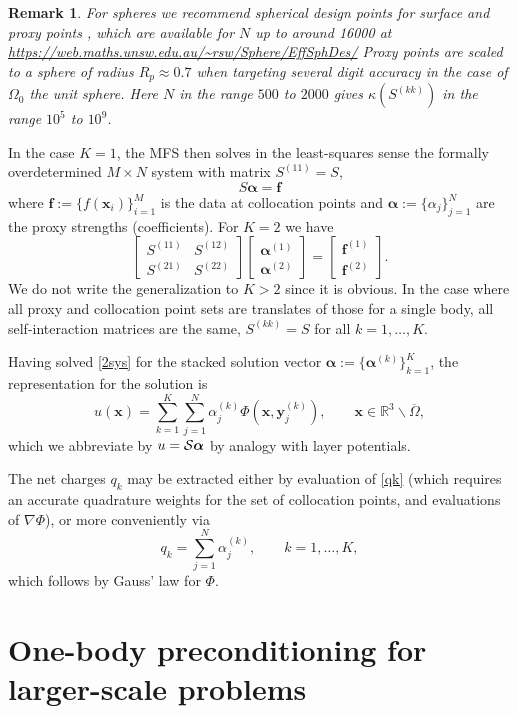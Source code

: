 \documentclass[10pt]{article}
\newcommand{\be}{\begin{equation}}
\newcommand{\ee}{\end{equation}}
\newcommand{\R}{\mathbb{R}}
\newcommand{\vt}[2]{\left[\begin{array}{r}#1\\#2\end{array}\right]} %
\newcommand{\mt}[4]{\left[\begin{array}{rr}#1&#2\\#3&#4\end{array}\right]} %
\newtheorem{rmk}[thm]{Remark}
\newcommand{\x}{\mathbf{x}}
\newcommand{\y}{\mathbf{y}}
\newcommand{\f}{\mathbf{f}}
\newcommand{\bal}{\bm{\alpha}}
\newcommand{\E}{\R^3\backslash\overline{\Omega}}    %
\newcommand{\ok}{^{(k)}}
\begin{document}
\begin{rmk}
  For spheres we recommend spherical design points for surface and proxy
  points \cite{sphdesign},
which are available for $N$ up to around 16000 at
\url{https://web.maths.unsw.edu.au/~rsw/Sphere/EffSphDes/}
Proxy points are scaled to a sphere of radius $R_p \approx 0.7$
when targeting several digit accuracy in the case of $\Omega_0$ the unit sphere.
Here $N$ in the range $500$ to $2000$ gives
$\kappa(S^{(kk)})$ in the range $10^5$ to $10^9$.
\end{rmk}

In the case $K=1$, the MFS then solves in the least-squares sense the
formally overdetermined $M\times N$ system with matrix $S^{(11)} = S$,
\be
S \bal = \f
\label{1sys}
\ee
where $\f:=\{f(\x_i)\}_{i=1}^M$ is the data at collocation points
and $\bal:=\{\alpha_j\}_{j=1}^N$ are the proxy strengths (coefficients).
For $K=2$ we have
\be
\mt{S^{(11)}}{S^{(12)}}{S^{(21)}}{S^{(22)}} \vt{\bal^{(1)}}{\bal^{(2)}} = \vt{\f^{(1)}}{\f^{(2)}}.
\label{2sys}
\ee
We do not write the generalization to $K>2$ since it is obvious.
In the case where all proxy and collocation point sets are
translates of those for a single body,
all self-interaction matrices are the same,
$S^{(kk)} = S$ for all $k=1,\dots,K$.

Having solved \eqref{2sys} for the stacked solution vector
$\bal:=\{\bal\ok\}_{k=1}^K$, the representation for the
solution is
\be
u(\x) = \sum_{k=1}^K \sum_{j=1}^N \alpha\ok_j \Phi(\x,\y\ok_j),
\qquad \x\in\E,
\label{rep}
\ee
which we abbreviate by $u = {\cal S}\bal$ by analogy with layer potentials.

The net charges $q_k$ may be extracted either by evaluation of
\eqref{qk} (which requires an accurate quadrature weights
for the set of collocation points, and evaluations of $\nabla \Phi$),
or more conveniently via
\be
q_k = \sum_{j=1}^N \alpha\ok_j, \qquad k=1,\dots,K,
\label{qkgauss}
\ee
which follows by Gauss' law for $\Phi$.


\section{One-body preconditioning for larger-scale problems}
\end{document}
